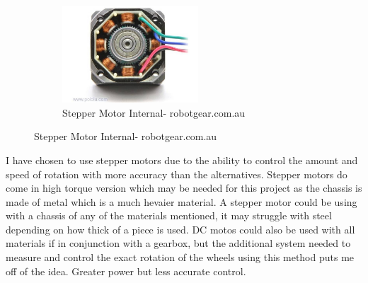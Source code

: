 \begin{itemize}
\begin{figure}[h]
\begin{subfigure}
        \caption{Stepper Motor - stepperonline.com}
        \label{Stepper Motor}
\end{subfigure}
\begin{subfigure}
        \centering
        \includegraphics[width=2.0in] {Images/stepper-internal.jpg}
        \caption{Stepper Motor Internal- robotgear.com.au}
        \label{Stepper Motor Internal}
\end{subfigure}
\end{figure}
\end{itemize}

I have chosen to use stepper motors due to the ability to control the amount and speed of rotation with more accuracy than the alternatives.  Stepper motors do come in high torque version which may be needed for this project as the chassis is made of metal which is a much hevaier material.  A stepper motor could be using with a chassis of any of the materials mentioned, it may struggle with steel depending on how thick of a piece is used.  DC motos could also be used with all materials if in conjunction with a gearbox, but the additional system needed to measure and control the exact rotation of the wheels using this method puts me off of the idea.  Greater power but less accurate control.

